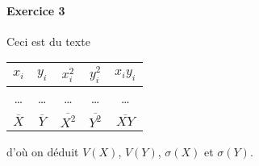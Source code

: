 \documentclass[10pt,a4paper,french]{article}
\begin{document}
\paragraph{Exercice 3}
Ceci est du texte
\begin{table}[h]
\centering
\begin{tabular}{ccccc}
$x_i$ & $y_i$ & $x_i^2$ & $y_i^2$ & $x_i y_i$ \\
\hline
\ldots & \ldots & \ldots & \ldots & \ldots \\
$\overline{X}$ & $\overline{Y}$ & $\overline{X^2}$ & $\overline{Y^2}$ & $\overline{X Y}$
\end{tabular}
\end{table}
d'où on déduit $V(X)$, $V(Y)$, $\sigma(X)$ et $\sigma(Y)$.
\end{document}
